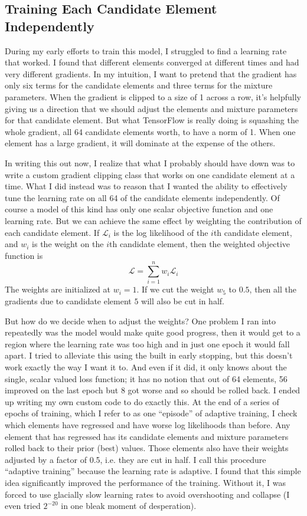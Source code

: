 \subsection{Training Each Candidate Element Independently}
During my early efforts to train this model, I struggled to find a learning rate that worked.
I found that different elements converged at different times and had very different gradients.
In my intuition, I want to pretend that the gradient has only six terms for the candidate elements and three terms for the mixture parameters.
When the gradient is clipped to a size of 1 across a row, 
it's helpfully giving us a direction that we should adjust the elements and mixture parameters for that candidate element.
But what TensorFlow is really doing is squashing the whole gradient, all 64 candidate elements worth, to have a norm of 1.
When one element has a large gradient, it will dominate at the expense of the others.

In writing this out now, I realize that what I probably should have down was to write a custom gradient clipping class that works on one candidate element at a time.
What I did instead was to reason that I wanted the ability to effectively tune the learning rate on all 64 of the candidate elements independently.
Of course a model of this kind has only one scalar objective function and one learning rate.
But we can achieve the same effect by weighting the contribution of each candidate element.
If $\mathcal{L}_i$ is the log likelihood of the $i$th candidate element, and $w_i$ is the weight on the $i$th candidate element,  
then the weighted objective function is 
$$\mathcal{L} = \sum_{i=1}^{n} w_i \mathcal{L}_i$$
The weights are initialized at $w_i=1$.  If we cut the weight $w_5$ to $0.5$, then all the gradients due to candidate element $5$ will also be cut in half.

But how do we decide when to adjust the weights?
One problem I ran into repeatedly was the model would make quite good progress, 
then it would get to a region where the learning rate was too high and in just one epoch it would fall apart.
I tried to alleviate this using the built in early stopping, but this doesn't work exactly the way I want it to.
And even if it did, it only knows about the single, scalar valued loss function;
it has no notion that out of 64 elements, 56 improved on the last epoch but 8 got worse and so should be rolled back.
I ended up writing my own custom code to do exactly this.
At the end of a series of epochs of training, which I refer to as one ``episode'' of adaptive training,
I check which elements have regressed and have worse log likelihoods than before.
Any element that has regressed has its candidate elements and mixture parameters rolled back to their prior (best) values.
Those elements also have their weights adjusted by a factor of 0.5, i.e. they are cut in half.
I call this procedure ``adaptive training'' because the learning rate is adaptive.
I found that this simple idea significantly improved the performance of the training.
Without it, I was forced to use glacially slow learning rates to avoid overshooting and collapse (I even tried $2^{-20}$ in one bleak moment of desperation).

